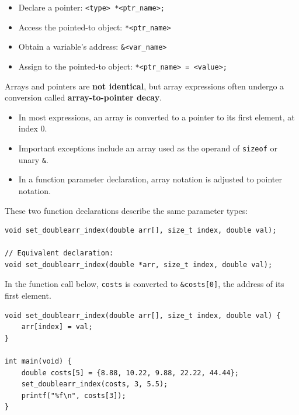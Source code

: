 \documentclass[11pt,a4paper]{article}
\begin{document}
\begin{itemize}
    \item Declare a pointer:
          \texttt{<type> *<ptr\_name>;}
    \item Access the pointed-to object:
          \texttt{*<ptr\_name>}
    \item Obtain a variable's address:
          \texttt{\&<var\_name>}
    \item Assign to the pointed-to object:
          \texttt{*<ptr\_name> = <value>;}
\end{itemize}



Arrays and pointers are \textbf{not identical}, but array expressions
often undergo a conversion called \textbf{array-to-pointer decay}.

\begin{itemize}
    \item In most expressions, an array is converted to a pointer
          to its first element, at index \(0\).
    \item Important exceptions include an array used as the operand
          of \texttt{sizeof} or unary \texttt{\&}.
    \item In a function parameter declaration, array notation is
          adjusted to pointer notation.
\end{itemize}

These two function declarations describe the same parameter types:
\begin{lstlisting}[style=cscode]
void set_doublearr_index(double arr[], size_t index, double val);

// Equivalent declaration:
void set_doublearr_index(double *arr, size_t index, double val);
\end{lstlisting}

In the function call below, \texttt{costs} is converted to
\texttt{\&costs[0]}, the address of its first element.

\begin{lstlisting}[style=cscode]
void set_doublearr_index(double arr[], size_t index, double val) {
    arr[index] = val;
}

int main(void) {
    double costs[5] = {8.88, 10.22, 9.88, 22.22, 44.44};
    set_doublearr_index(costs, 3, 5.5);
    printf("%f\n", costs[3]);
}
\end{lstlisting}
\end{document}
